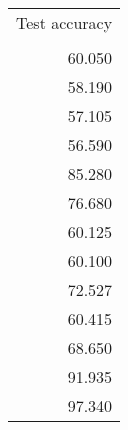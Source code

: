 \begin{tabular}{r}
\toprule
 Test accuracy \\
               \\
\midrule
        60.050 \\
        58.190 \\
        57.105 \\
        56.590 \\
        85.280 \\
        76.680 \\
        60.125 \\
        60.100 \\
        72.527 \\
        60.415 \\
        68.650 \\
        91.935 \\
        97.340 \\
\bottomrule
\end{tabular}

